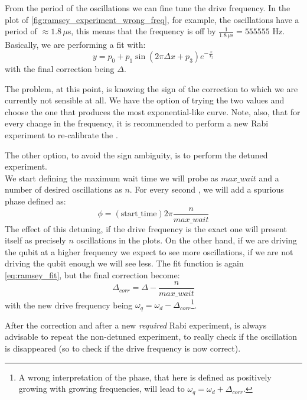 From the period of the oscillations we can fine tune the drive frequency.
In the plot of \cref{fig:ramsey_experiment_wrong_freq}, for example, the oscillations have a period of $\approx 1.8\,\mu$s, this means that the frequency is off by $\frac{1}{1.8\,\mu\text{s}}=555555$ Hz.
Basically, we are performing a fit with:
\begin{equation}\label{eq:ramsey_fit}
    y = p_0 + p_1\sin\left( 2\pi\Delta x + p_3 \right) e^{-\frac{x}{T_2}} 
\end{equation}
with the final correction being $\Delta$.

The problem, at this point, is knowing the sign of the correction to which we are currently not sensible at all.
We have the option of trying the two values and choose the one that produces the most exponential-like curve.
Note, also, that for every change in the frequency, it is recommended to perform a new Rabi experiment to re-calibrate the \pipulse.

The other option, to avoid the sign ambiguity, is to perform the detuned experiment.\\
We start defining the maximum wait time we will probe as $max\_wait$ and a number of desired oscillations as $n$.
For every second \pihpulse, we will add a spurious phase defined as:
\begin{equation}
    \phi = (\text{start\_time})2\pi \frac{n}{max\_wait}
\end{equation}
The effect of this detuning, if the drive frequency is the exact one will present itself as precisely $n$ oscillations in the plots.
On the other hand, if we are driving the qubit at a higher frequency we expect to see more oscillations, if we are not driving the qubit enough we will see less.
The fit function is again \cref{eq:ramsey_fit}, but the final correction become:
\begin{equation}
    \Delta_{corr} = \Delta - \frac{n}{max\_wait}
\end{equation}
with the new drive frequency being $\omega_q = \omega_d - \Delta_{corr}$\footnote{A wrong interpretation of the phase, that here is defined as positively growing with growing frequencies, will lead to $\omega_q = \omega_d + \Delta_{corr}$.}.

After the correction and after a new \textit{required} Rabi experiment, is always advisable to repeat the non-detuned experiment, to really check if the oscillation is disappeared (so to check if the drive frequency is now correct).

